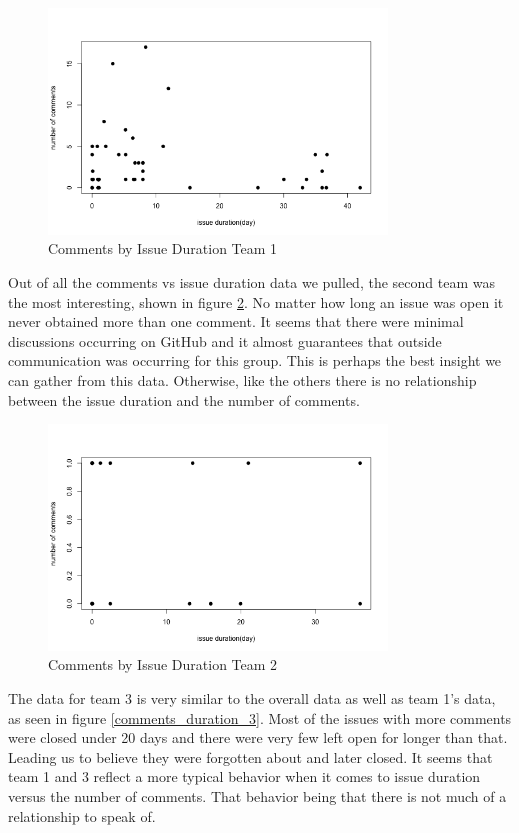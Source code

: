 \documentclass[conference]{IEEEtran}
\begin{document}
\begin{figure}[H]
    \centering
    \includegraphics[width=9cm]{../AprilProject/pic/comments_and_issue_duration1.png}
    \caption{Comments by Issue Duration Team 1}
    \label{comments_duration_1}
\end{figure}

Out of all the comments vs issue duration data we pulled, the second team was the most interesting, shown in figure \ref{comments_duration_2}. No matter how long an issue was open it never obtained more than one comment. It seems that there were minimal discussions occurring on GitHub and it almost guarantees that outside communication was occurring for this group. This is perhaps the best insight we can gather from this data. Otherwise, like the others there is no relationship between the issue duration and the number of comments. 

\begin{figure}[H]
    \centering
    \includegraphics[width=9cm]{../AprilProject/pic/comments_and_issue_duration2.png}
    \caption{Comments by Issue Duration Team 2}
    \label{comments_duration_2}
\end{figure}

The data for team 3 is very similar to the overall data as well as team 1's data, as seen in figure \ref{comments_duration_3}. Most of the issues with more comments were closed under 20 days and there were very few left open for longer than that. Leading us to believe they were forgotten about and later closed. It seems that team 1 and 3 reflect a more typical behavior when it comes to issue duration versus the number of comments. That behavior being that there is not much of a relationship to speak of. 
\end{document}
